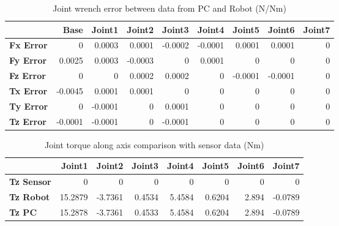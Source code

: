 \begin{table}[h!]
	\centering
	\caption{Joint wrench error between data from PC and Robot (N/Nm)}
	\label{wrech_Error_Pose2}
	\begin{tabular}{|l|r|r|r|r|r|r|r|r|}
		\hline
		\textbf{}  & \textbf{Base} & \textbf{Joint1}  & \textbf{Joint2}  & \textbf{Joint3}  & \textbf{Joint4}  & \textbf{Joint5}  & \textbf{Joint6}  & \textbf{Joint7} \\ \hline
		\textbf{Fx Error}  & 0        & 0.0003        & 0.0001        & -0.0002        & -0.0001        & 0.0001        & 0.0001        & 0 \\ \hline
		\textbf{Fy Error}  & 0.0025        & 0.0003        & -0.0003        & 0        & 0.0001        & 0        & 0        & 0 \\ \hline
		\textbf{Fz Error}  & 0        & 0        & 0.0002        & 0.0002        & 0        & -0.0001        & -0.0001        & 0 \\ \hline
		\textbf{Tx Error}  & -0.0045        & 0.0001        & 0.0001        & 0        & 0        & 0        & 0        & 0 \\ \hline
		\textbf{Ty Error}  & 0        & -0.0001        & 0        & 0.0001        & 0        & 0        & 0        & 0 \\ \hline
		\textbf{Tz Error}  & -0.0001        & -0.0001        & 0        & -0.0001        & 0        & 0        & 0        & 0 \\ \hline
	\end{tabular}
\end{table}

\begin{table}[h!]
	\centering
	\caption{Joint torque along axis comparison with sensor data (Nm)}
	\label{wrech_Sensor_Pose2}
	\begin{tabular}{|l|r|r|r|r|r|r|r|}
		\hline
		\textbf{} & \textbf{Joint1} & \textbf{Joint2} & \textbf{Joint3} & \textbf{Joint4} & \textbf{Joint5} & \textbf{Joint6} & \textbf{Joint7} \\ \hline
		\textbf{Tz Sensor}  & 0           & 0           & 0            & 0           & 0           & 0           & 0           \\ \hline
		\textbf{Tz Robot}  	& 15.2879           & -3.7361           & 0.4534            & 5.4584           & 0.6204           & 2.894           & -0.0789           \\ \hline
		\textbf{Tz PC}  	& 15.2878           & -3.7361           & 0.4533            & 5.4584           & 0.6204           & 2.894           & -0.0789           \\ \hline
	\end{tabular}
\end{table}

